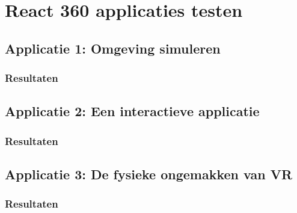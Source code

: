 \chapter{React 360 applicaties testen}
\label{ch:react-360-apps}

\section{Applicatie 1: Omgeving simuleren}
\label{sec:omgeving-simulatie}

\subsection{Resultaten}
\label{sec:resulaten-app1}

\section{Applicatie 2: Een interactieve applicatie}
\label{sec:interactieve-applicatie}

\subsection{Resultaten}
\label{sec:resulaten-app2}

\section{Applicatie 3: De fysieke ongemakken van VR}
\label{sec:fysieke-ongemakken-vr}

\subsection{Resultaten}
\label{sec:resulaten-app3}